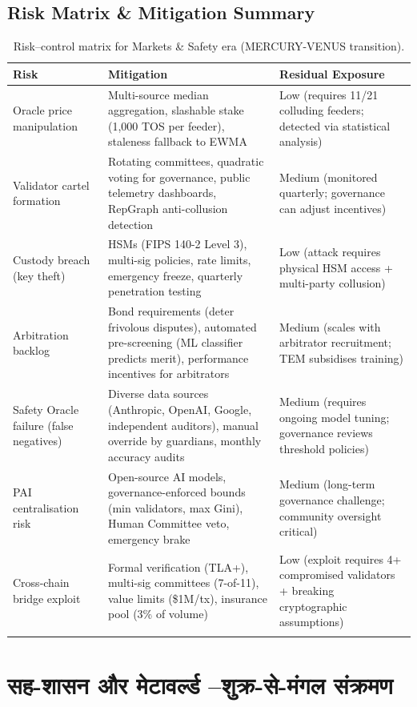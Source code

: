 \documentclass[11pt]{article}
\begin{document}
\subsection{Risk Matrix \& Mitigation Summary}
\begin{longtable}{@{}p{}p{}p{}@{}}
\toprule
\textbf{Risk} & \textbf{Mitigation} & \textbf{Residual Exposure} \\\midrule
Oracle price manipulation & Multi-source median aggregation, slashable stake (1,000 TOS per feeder), staleness fallback to EWMA & Low (requires 11/21 colluding feeders; detected via statistical analysis) \\
Validator cartel formation & Rotating committees, quadratic voting for governance, public telemetry dashboards, RepGraph anti-collusion detection & Medium (monitored quarterly; governance can adjust incentives) \\
Custody breach (key theft) & HSMs (FIPS 140-2 Level 3), multi-sig policies, rate limits, emergency freeze, quarterly penetration testing & Low (attack requires physical HSM access + multi-party collusion) \\
Arbitration backlog & Bond requirements (deter frivolous disputes), automated pre-screening (ML classifier predicts merit), performance incentives for arbitrators & Medium (scales with arbitrator recruitment; TEM subsidises training) \\
Safety Oracle failure (false negatives) & Diverse data sources (Anthropic, OpenAI, Google, independent auditors), manual override by guardians, monthly accuracy audits & Medium (requires ongoing model tuning; governance reviews threshold policies) \\
PAI centralisation risk & Open-source AI models, governance-enforced bounds (min validators, max Gini), Human Committee veto, emergency brake & Medium (long-term governance challenge; community oversight critical) \\
Cross-chain bridge exploit & Formal verification (TLA+), multi-sig committees (7-of-11), value limits (\$1M/tx), insurance pool (3\% of volume) & Low (exploit requires 4+ compromised validators + breaking cryptographic assumptions) \\\bottomrule
\caption{Risk--control matrix for Markets \& Safety era (MERCURY-VENUS transition).}
\label{tab:risk-markets-expanded}
\end{longtable}

\section{सह-शासन और मेटावर्ल्ड --शुक्र-से-मंगल संक्रमण}
\end{document}
